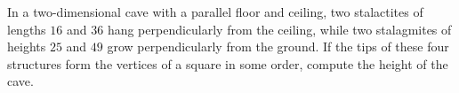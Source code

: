 In a two-dimensional cave with a parallel floor and ceiling, two stalactites of lengths $16$ and $36$ hang perpendicularly from the ceiling, while two stalagmites of heights $25$ and $49$ grow perpendicularly from the ground. If the tips of these four structures form the vertices of a square in some order, compute the height of the cave.